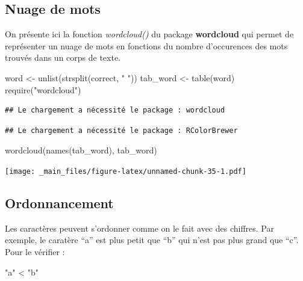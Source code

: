 \documentclass[
]{book}
\newenvironment{Shaded}{\begin{snugshade}}{\end{snugshade}}
\newcommand{\FunctionTok}[1]{\textcolor[rgb]{0.00,0.00,0.00}{#1}}
\newcommand{\NormalTok}[1]{#1}
\newcommand{\OtherTok}[1]{\textcolor[rgb]{0.56,0.35,0.01}{#1}}
\newcommand{\SpecialCharTok}[1]{\textcolor[rgb]{0.00,0.00,0.00}{#1}}
\newcommand{\StringTok}[1]{\textcolor[rgb]{0.31,0.60,0.02}{#1}}
\theoremstyle{definition}
\theoremstyle{definition}
\theoremstyle{definition}
\theoremstyle{definition}
\theoremstyle{remark}
\begin{document}
\hypertarget{nuage-de-mots}{%
\subsection{Nuage de mots}\label{nuage-de-mots}}

On présente ici la fonction \emph{wordcloud()} du package \textbf{wordcloud} qui permet de représenter un nuage de mots en fonctions du nombre d'occurences des mots trouvés dans un corps de texte.

\begin{Shaded}
\begin{Highlighting}[]
\NormalTok{word }\OtherTok{\textless{}{-}} \FunctionTok{unlist}\NormalTok{(}\FunctionTok{strsplit}\NormalTok{(correct, }\StringTok{" "}\NormalTok{))}
\NormalTok{tab\_word }\OtherTok{\textless{}{-}} \FunctionTok{table}\NormalTok{(word)}
\FunctionTok{require}\NormalTok{(}\StringTok{"wordcloud"}\NormalTok{)}
\end{Highlighting}
\end{Shaded}

\begin{verbatim}
## Le chargement a nécessité le package : wordcloud
\end{verbatim}

\begin{verbatim}
## Le chargement a nécessité le package : RColorBrewer
\end{verbatim}

\begin{Shaded}
\begin{Highlighting}[]
\FunctionTok{wordcloud}\NormalTok{(}\FunctionTok{names}\NormalTok{(tab\_word), tab\_word)}
\end{Highlighting}
\end{Shaded}

\texttt{[image: \_main\_files/figure-latex/unnamed-chunk-35-1.pdf]}

\hypertarget{ordonnancement}{%
\subsection{Ordonnancement}\label{ordonnancement}}

Les caractères peuvent s'ordonner comme on le fait avec des chiffres. Par exemple, le caratère ``a'' est plus petit que ``b'' qui n'est pas plus grand que ``c''. Pour le vérifier :

\begin{Shaded}
\begin{Highlighting}[]
\StringTok{"a"} \SpecialCharTok{\textless{}} \StringTok{"b"}
\end{Highlighting}
\end{Shaded}
\end{document}
